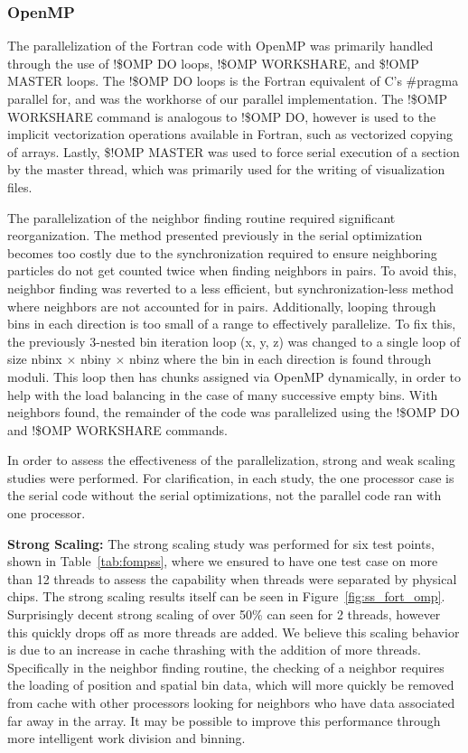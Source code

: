 \documentclass{scrartcl}
\begin{document}
  \subsubsection{OpenMP}
  The parallelization of the Fortran code with OpenMP was primarily handled through the use of !\$OMP DO loops, !\$OMP WORKSHARE, and \$!OMP MASTER loops. The !\$OMP DO loops is the Fortran equivalent of C's \#pragma parallel for, and was the workhorse of our parallel implementation. The !\$OMP WORKSHARE command is analogous to !\$OMP DO, however is used to the implicit vectorization operations available in Fortran, such as vectorized copying of arrays. Lastly, \$!OMP MASTER was used to force serial execution of a section by the master thread, which was primarily used for the writing of visualization files.
  
  The parallelization of the neighbor finding routine required significant reorganization. The method presented previously in the serial optimization becomes too costly due to the synchronization required to ensure neighboring particles do not get counted twice when finding neighbors in pairs. To avoid this, neighbor finding was reverted to a less efficient, but synchronization-less method where neighbors are not accounted for in pairs.  Additionally, looping through bins in each direction is too small of a range to effectively parallelize. To fix this, the previously 3-nested bin iteration loop (x, y, z) was changed to a single loop of size nbinx $\times$ nbiny $\times$ nbinz where the bin in each direction is found through moduli. This loop then has chunks assigned via OpenMP dynamically, in order to help with the load balancing in the case of many successive empty bins. With neighbors found, the remainder of the code was parallelized using the !\$OMP DO and !\$OMP WORKSHARE commands.
  
  In order to assess the effectiveness of the parallelization, strong and weak scaling studies were performed. For clarification, in each study, the one processor case is the serial code without the serial optimizations, not the parallel code ran with one processor.
  
  \textbf{Strong Scaling:}
  The strong scaling study was performed for six test points, shown in Table~\ref{tab:fompss}, where we ensured to have one test case on more than 12 threads to assess the capability when threads were separated by physical chips. The strong scaling results itself can be seen in Figure~\ref{fig:ss_fort_omp}. Surprisingly decent strong scaling of over 50\% can seen for 2 threads, however this quickly drops off as more threads are added. We believe this scaling behavior is due to an increase in cache thrashing with the addition of more threads. Specifically in the neighbor finding routine, the checking of a neighbor requires the loading of position and spatial bin data, which will more quickly be removed from cache with other processors looking for neighbors who have data associated far away in the array. It may be possible to improve this performance through more intelligent work division and binning.
  
\end{document}
